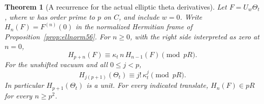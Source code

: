 \documentclass[a4paper,11pt]{article}
\newtheorem{theorem}[proposition]{Theorem}
\theoremstyle{definition}
\theoremstyle{remark}
\numberwithin{equation}{section}
\begin{document}
\begin{theorem}[A recurrence for the actual elliptic theta derivatives]\label{thm:hurwitz62}
Let \(F=U_w\Theta_t\), where \(w\) has order prime to \(p\)
on \(C\), and include \(w=0\). Write \(H_n(F)=F^{(n)}(0)\)
in the normalized Hermitian frame of Proposition~\ref{prop:ellnorm56}.
For \(n\ge0\), with the right side interpreted as zero at \(n=0\),
\begin{equation}
             H_{p+n}(F)\equiv
                \kappa_t\, n\,H_{n-1}(F) \pmod {pR}.       \label{eq:rec62}
\end{equation}
For the unshifted vacuum and all \(0\le j<p\),
\[
           H_{j(p+1)}(\Theta_t)\equiv j!\,\kappa_t^j\pmod{pR}.
\]
In particular \(H_{p+1}(\Theta_t)\) is a unit. For every indicated
translate, \(H_n(F)\in pR\) for every \(n\ge p^2\).
\end{theorem}
\end{document}
